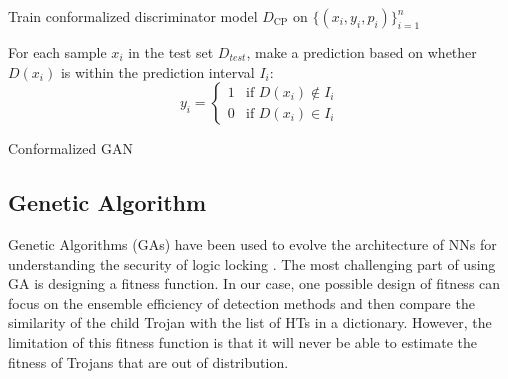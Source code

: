 \begin{algorithm} [t]



Train conformalized discriminator model $D_\text{CP}$ on $\{(x_i, y_i, p_i)\}_{i=1}^n$\;

For each sample $x_i$ in the test set $D_{test}$, make a prediction based on whether $D(x_i)$ is within the prediction interval $I_i$:
\begin{equation*}
y_i =
\begin{cases}
1 & \text{if } D(x_i) \notin I_i \\
0 & \text{if } D(x_i) \in I_i
\end{cases}
\end{equation*}


\caption{Conformalized GAN}
\label{alg:cgan1}
\end{algorithm}

\subsection*{Genetic Algorithm} 
\label{sec:GA}
Genetic Algorithms (GAs) \cite{holland1992genetic} have been used to evolve the architecture of NNs for understanding the security of logic locking \cite{sisejkovic2021challenging}. The most challenging part of using GA is designing a fitness function. In our case, one possible design of fitness can focus on the ensemble efficiency of detection methods and then compare the similarity of the child Trojan with the list of HTs in a dictionary. However, the limitation of this fitness function is that it will never be able to estimate the fitness of Trojans that are out of distribution.

